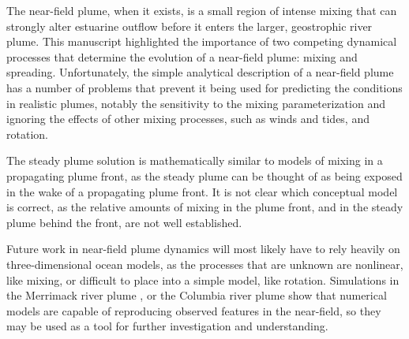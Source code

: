 \documentclass[12pt]{article}
\begin{document}
The near-field plume, when it exists, is a small region of intense mixing that can strongly alter estuarine outflow before it enters the larger, geostrophic river plume. This manuscript highlighted the importance of two competing dynamical processes that determine the evolution of a near-field plume: mixing and spreading. Unfortunately, the simple analytical description of a near-field plume has a number of problems that prevent it being used for predicting the conditions in realistic plumes, notably the sensitivity to the mixing parameterization and ignoring the effects of other mixing processes, such as winds and tides, and rotation. 

The steady plume solution is mathematically similar to models of mixing in a propagating plume front, as the steady plume can be thought of as being exposed in the wake of a propagating plume front. It is not clear which conceptual model is correct, as the relative amounts of mixing in the plume front, and in the steady plume behind the front, are not well established. 

Future work in near-field plume dynamics will most likely have to rely heavily on three-dimensional ocean models, as the processes that are unknown are nonlinear, like mixing, or difficult to place into a simple model, like rotation. Simulations in the Merrimack river plume \citep{macdonald.ea:07, hetland.macdonald:08}, or the Columbia river plume \citep{maccready.ea:09} show that numerical models are capable of reproducing observed features in the near-field, so they may be used as a tool for further investigation and understanding.







\end{document}
